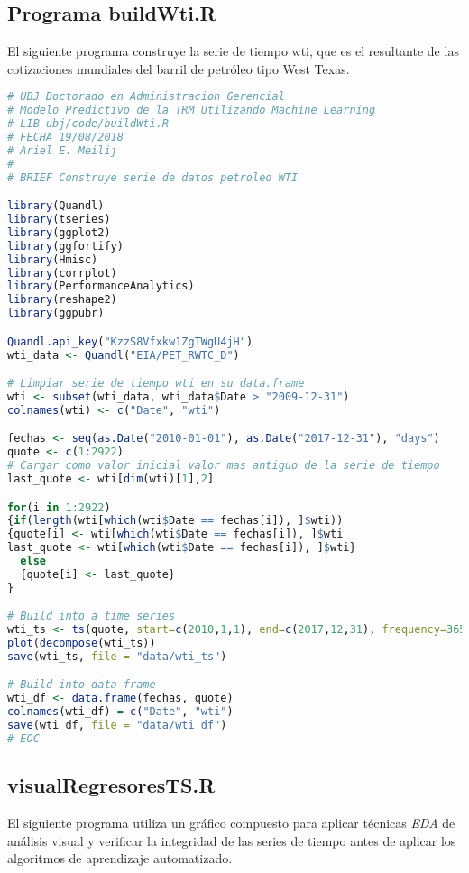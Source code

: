 \subsection{Programa buildWti.R}
El siguiente programa construye la serie de tiempo wti, que es el resultante de las cotizaciones mundiales del barril de petróleo tipo West Texas. 
\begin{lstlisting}[language=R]
# UBJ Doctorado en Administracion Gerencial
# Modelo Predictivo de la TRM Utilizando Machine Learning
# LIB ubj/code/buildWti.R 
# FECHA 19/08/2018
# Ariel E. Meilij
#
# BRIEF Construye serie de datos petroleo WTI

library(Quandl)
library(tseries)
library(ggplot2)
library(ggfortify)
library(Hmisc)
library(corrplot)
library(PerformanceAnalytics)
library(reshape2)
library(ggpubr)

Quandl.api_key("KzzS8Vfxkw1ZgTWgU4jH")
wti_data <- Quandl("EIA/PET_RWTC_D")

# Limpiar serie de tiempo wti en su data.frame
wti <- subset(wti_data, wti_data$Date > "2009-12-31")
colnames(wti) <- c("Date", "wti")

fechas <- seq(as.Date("2010-01-01"), as.Date("2017-12-31"), "days")
quote <- c(1:2922)
# Cargar como valor inicial valor mas antiguo de la serie de tiempo
last_quote <- wti[dim(wti)[1],2]

for(i in 1:2922)
{if(length(wti[which(wti$Date == fechas[i]), ]$wti))
{quote[i] <- wti[which(wti$Date == fechas[i]), ]$wti
last_quote <- wti[which(wti$Date == fechas[i]), ]$wti}
  else
  {quote[i] <- last_quote}
}

# Build into a time series
wti_ts <- ts(quote, start=c(2010,1,1), end=c(2017,12,31), frequency=365)
plot(decompose(wti_ts))
save(wti_ts, file = "data/wti_ts")

# Build into data frame
wti_df <- data.frame(fechas, quote)
colnames(wti_df) = c("Date", "wti")
save(wti_df, file = "data/wti_df")
# EOC
\end{lstlisting}

\subsection{visualRegresoresTS.R}
El siguiente programa utiliza un gráfico compuesto para aplicar técnicas \emph{EDA} de análisis visual y verificar la integridad de las series de tiempo antes de aplicar los algoritmos de aprendizaje automatizado.

